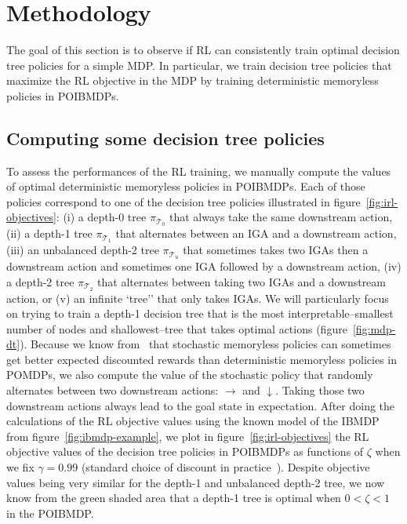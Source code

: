 \section{Methodology}\label{sec:methodology}
The goal of this section is to observe if RL can consistently train optimal decision tree policies for a simple MDP.
In particular, we train decision tree policies that maximize the RL objective in the MDP by training deterministic memoryless policies in POIBMDPs.

\subsection{Computing some decision tree policies}
To assess the performances of the RL training, we manually compute the values of optimal deterministic memoryless policies in POIBMDPs.
Each of those policies correspond to one of the decision tree policies illustrated in figure~\ref{fig:irl-objectives}: (i) a depth-0 tree $\pi_{\mathcal{T}_0}$ that always take the same downstream action, (ii) a depth-1 tree $\pi_{\mathcal{T}_1}$ that alternates between an IGA and a downstream action, (iii) an unbalanced depth-2 tree $\pi_{\mathcal{T}_u}$ that sometimes takes two IGAs then a downstream action and sometimes one IGA followed by a downstream action, (iv) a depth-2 tree $\pi_{\mathcal{T}_2}$ that alternates between taking two IGAs and a downstream action, or (v) an infinite `tree'' that only takes IGAs.
We will particularly focus on trying to train a depth-1 decision tree that is the most interpretable--smallest number of nodes and shallowest--tree that takes optimal actions (figure~\ref{fig:mdp-dt}).
Because we know from~\cite{learning-pomdp} that stochastic memoryless policies can sometimes get better expected discounted rewards than deterministic memoryless policies in POMDPs, we also compute the value of the stochastic policy that randomly alternates between two downstream actions: $\rightarrow$ and $\downarrow$.
Taking those two downstream actions always lead to the goal state in expectation.
After doing the calculations of the RL objective values using the known model of the IBMDP from figure~\ref{fig:ibmdp-example}, we plot in figure~\ref{fig:irl-objectives} the RL objective values of the decision tree policies in POIBMDPs as functions of $\zeta$ when we fix $\gamma=0.99$ (standard choice of discount in practice~\cite{sutton}).
Despite objective values being very similar for the depth-1 and unbalanced depth-2 tree, we now know from the green shaded area that a depth-1 tree is optimal when $0< \zeta < 1$ in the POIBMDP. 
